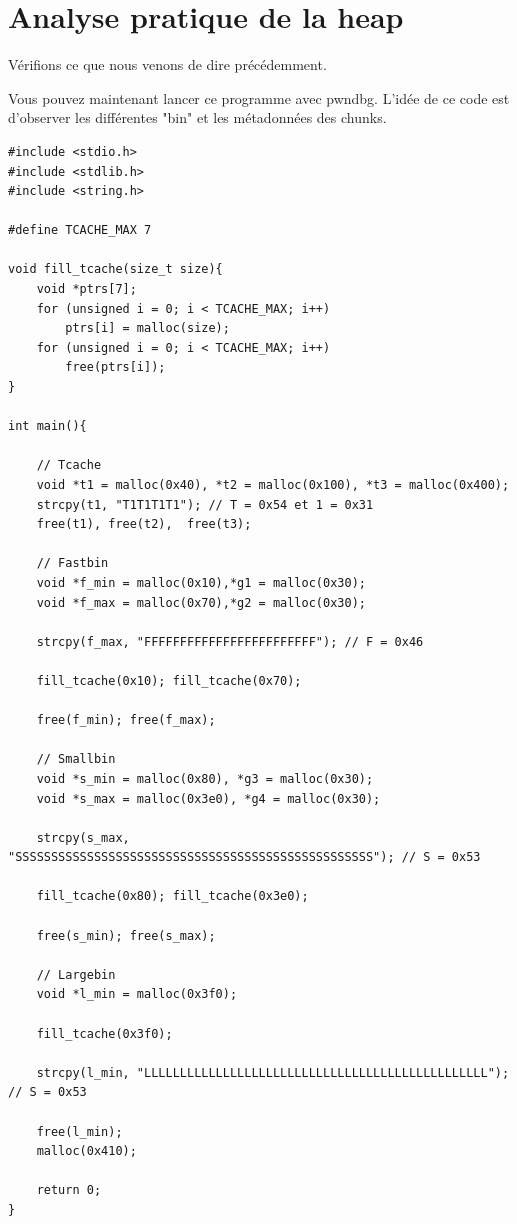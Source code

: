 \section{Analyse pratique de la heap}
\label{sec:Analyse_du_tas}

Vérifions ce que nous venons de dire précédemment.

Vous pouvez maintenant lancer ce programme avec pwndbg.
L'idée de ce code est d'observer les différentes "bin" et les métadonnées des chunks.

\begin{verbatim}
#include <stdio.h>
#include <stdlib.h>
#include <string.h>

#define TCACHE_MAX 7

void fill_tcache(size_t size){
    void *ptrs[7];
    for (unsigned i = 0; i < TCACHE_MAX; i++)
        ptrs[i] = malloc(size);
    for (unsigned i = 0; i < TCACHE_MAX; i++)
        free(ptrs[i]);
}

int main(){

    // Tcache
    void *t1 = malloc(0x40), *t2 = malloc(0x100), *t3 = malloc(0x400);
    strcpy(t1, "T1T1T1T1"); // T = 0x54 et 1 = 0x31
    free(t1), free(t2),  free(t3);

    // Fastbin
    void *f_min = malloc(0x10),*g1 = malloc(0x30);
    void *f_max = malloc(0x70),*g2 = malloc(0x30);

    strcpy(f_max, "FFFFFFFFFFFFFFFFFFFFFFFF"); // F = 0x46

    fill_tcache(0x10); fill_tcache(0x70);

    free(f_min); free(f_max);

    // Smallbin
    void *s_min = malloc(0x80), *g3 = malloc(0x30);
    void *s_max = malloc(0x3e0), *g4 = malloc(0x30);

    strcpy(s_max, "SSSSSSSSSSSSSSSSSSSSSSSSSSSSSSSSSSSSSSSSSSSSSSSSSS"); // S = 0x53

    fill_tcache(0x80); fill_tcache(0x3e0);

    free(s_min); free(s_max);

    // Largebin
    void *l_min = malloc(0x3f0);

    fill_tcache(0x3f0);

    strcpy(l_min, "LLLLLLLLLLLLLLLLLLLLLLLLLLLLLLLLLLLLLLLLLLLLLLLL"); // S = 0x53

    free(l_min);
    malloc(0x410);

    return 0;
}


\end{verbatim}


